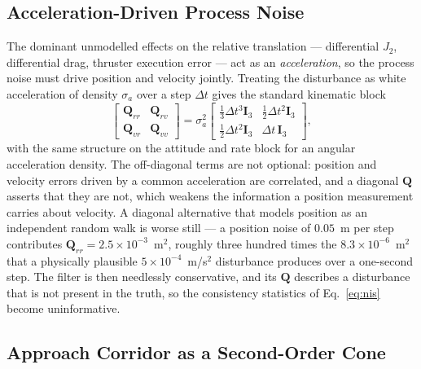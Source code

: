 \subsection{Acceleration-Driven Process Noise}
\label{sec:process_noise}

The dominant unmodelled effects on the relative translation --- differential
$J_2$, differential drag, thruster execution error --- act as an
\emph{acceleration}, so the process noise must drive position and velocity
jointly. Treating the disturbance as white acceleration of density
$\sigma_a$ over a step $\Delta t$ gives the standard kinematic block
\begin{equation}
\begin{bmatrix}
\mathbf{Q}_{rr} & \mathbf{Q}_{rv} \\
\mathbf{Q}_{vr} & \mathbf{Q}_{vv}
\end{bmatrix}
= \sigma_a^2
\begin{bmatrix}
\tfrac{1}{3}\Delta t^3 \mathbf{I}_3 & \tfrac{1}{2}\Delta t^2 \mathbf{I}_3 \\
\tfrac{1}{2}\Delta t^2 \mathbf{I}_3 & \Delta t\, \mathbf{I}_3
\end{bmatrix},
\label{eq:Q_kin}
\end{equation}
with the same structure on the attitude and rate block for an angular
acceleration density. The off-diagonal terms are not optional: position and
velocity errors driven by a common acceleration are correlated, and a diagonal
$\mathbf{Q}$ asserts that they are not, which weakens the information a
position measurement carries about velocity. A diagonal alternative that
models position as an independent random walk is worse still --- a position
noise of $0.05$~m per step contributes
$\mathbf{Q}_{rr} = 2.5 \times 10^{-3}$~m$^2$, roughly three hundred times the
$8.3 \times 10^{-6}$~m$^2$ that a physically plausible
$5 \times 10^{-4}$~m/s$^2$ disturbance produces over a one-second step. The
filter is then needlessly conservative, and its $\mathbf{Q}$ describes a
disturbance that is not present in the truth, so the consistency statistics of
Eq.~\eqref{eq:nis} become uninformative.

\subsection{Approach Corridor as a Second-Order Cone}
\label{sec:cone}

